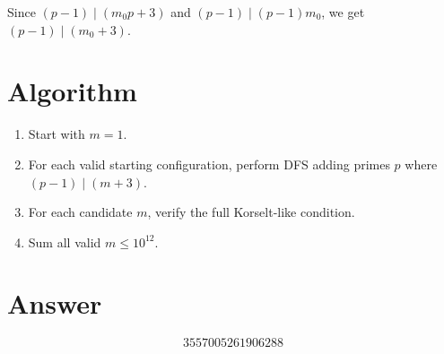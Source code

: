 \documentclass[12pt]{article}
\begin{document}
Since $(p-1) \mid (m_0 p + 3)$ and $(p-1) \mid (p-1)m_0$, we get $(p-1) \mid (m_0 + 3)$.

\section{Algorithm}
\begin{enumerate}
    \item Start with $m = 1$.
    \item For each valid starting configuration, perform DFS adding primes $p$ where $(p-1) \mid (m+3)$.
    \item For each candidate $m$, verify the full Korselt-like condition.
    \item Sum all valid $m \leq 10^{12}$.
\end{enumerate}

\section{Answer}

\[
\boxed{3557005261906288}
\]
\end{document}
